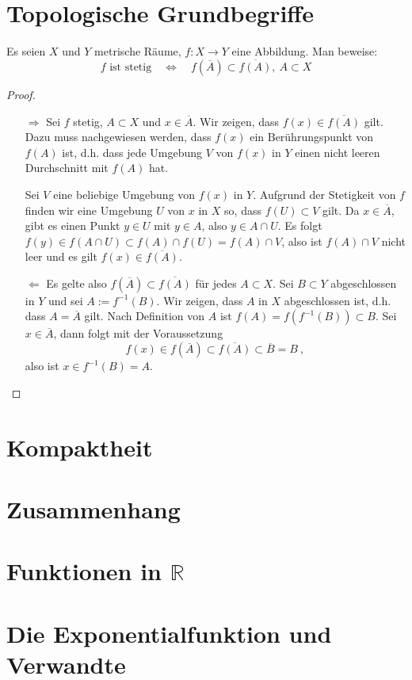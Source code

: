 \section{Topologische Grundbegriffe}
\setcounter{aufgabe}{11}
\begin{aufgabe}
	Es seien $X$ und $Y$ metrische Räume, $f: X \to Y$ eine Abbildung. Man beweise:
	\[
		f \text{ ist stetig} \quad \Leftrightarrow \quad f(\overline A) \subset \overline{f(A)}, \ A \subset X
	\]
\end{aufgabe}
\begin{proof}
	\begin{itemize}
		\item[\glqq$\Rightarrow$\grqq] Sei $f$ stetig, $A \subset X$ und $x \in \overline A$. Wir zeigen, 
		dass $f(x) \in \overline {f(A)}$ gilt. Dazu muss nachgewiesen werden, dass $f(x)$ ein 
		Berührungspunkt von $f(A)$ ist, d.h. dass jede Umgebung $V$ von $f(x)$ in $Y$ einen nicht
		leeren Durchschnitt mit $f(A)$ hat.

		Sei $V$ eine beliebige Umgebung von $f(x)$ in $Y$. Aufgrund der Stetigkeit von $f$ finden
		wir eine Umgebung $U$ von $x$ in $X$ so, dass $f(U) \subset V$ gilt. Da $x \in \overline A$, 
		gibt es einen Punkt $y \in U$ mit $y \in A$, also $y \in A \cap U$. Es folgt
		$f(y) \in f(A \cap U) \subset f(A) \cap f(U) = f(A) \cap V$, also ist $f(A) \cap V$ nicht leer
		und es gilt $f(x) \in \overline{ f(A) }$.
	\item[\glqq$\Leftarrow$\grqq] Es gelte also $f(\overline A) \subset \overline{f(A)}$ für
		jedes $A \subset X$. Sei $B \subset Y$ abgeschlossen in $Y$ und sei $A := f^{-1}(B)$.
		Wir zeigen, dass $A$ in $X$ abgeschlossen ist, d.h. dass $A = \overline A$ gilt.
		Nach Definition von $A$ ist $f(A) = f(f^{-1}(B)) \subset B$.
		Sei $x \in \overline A$, dann folgt mit der Voraussetzung
		\[
			f(x) \in f(\overline A) \subset \overline{ f(A) } \subset \overline B = B \ ,
		\]
		also ist $x \in f^{-1}(B) = A$.
	\end{itemize}
\end{proof}


\section{Kompaktheit}
\section{Zusammenhang}
\section{Funktionen in $\mathbb R$}
\section{Die Exponentialfunktion und Verwandte}
